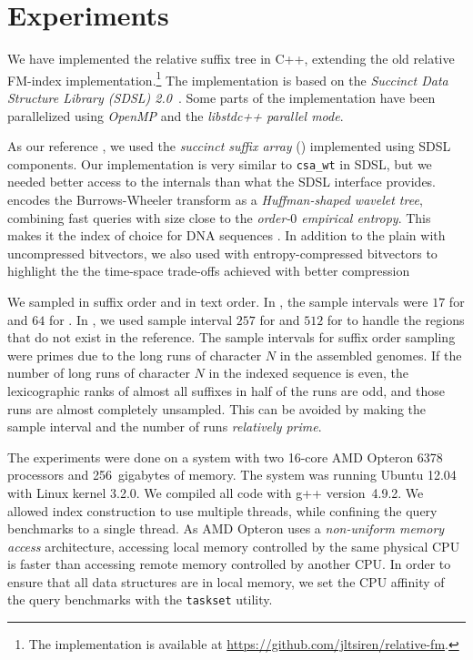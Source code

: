 \section{Experiments}

We have implemented the relative suffix tree in C++, extending the
old relative FM-index implementation.\footnote{The implementation is available
at \url{https://github.com/jltsiren/relative-fm}.} The implementation is based
on the \emph{Succinct Data Structure Library (SDSL) 2.0}~\cite{Gog2014b}. Some
parts of the implementation have been parallelized using \emph{OpenMP} and the
\emph{libstdc++ parallel mode}.

As our reference \CSA{}, we used the \emph{succinct suffix array} (\SSA{})
\cite{Ferragina2007a,Maekinen2005} implemented using SDSL components. Our
implementation is very similar to \texttt{csa\_wt} in SDSL, but we needed
better access to the internals than what the SDSL interface
provides. \SSA{} encodes the Burrows-Wheeler transform as a \emph{Huffman-shaped
wavelet tree}, combining fast queries with size close to the
\emph{order\nobreakdash-$0$ empirical entropy}. This makes it the
index of choice for DNA sequences \cite{Ferragina2009a}. In addition to
the plain \SSA{} with uncompressed bitvectors, we also used \SSArrr{} with
entropy-compressed bitvectors \cite{Raman2007} to highlight the
the time-space trade-offs achieved with better compression

We sampled \SA{} in suffix order and \ISA{} in text order. In \SSA, the sample
intervals were $17$ for \SA{} and $64$ for \ISA. In \RFM, we used sample
interval $257$ for \SA{} and $512$ for \ISA{} to handle the regions that do
not exist in the reference. The sample intervals for suffix order sampling
were primes due to the long runs of character $N$ in the assembled genomes. If
the number of long runs of character $N$ in the indexed sequence is even, the
lexicographic ranks of almost all suffixes in half of the runs are odd, and
those runs are almost completely unsampled. This can be avoided by making the
sample interval and the number of runs \emph{relatively prime}.

The experiments were done on a system with two 16\nobreakdash-core AMD Opteron 6378 processors and 256~gigabytes of memory. The system was running Ubuntu 12.04 with Linux kernel 3.2.0. We compiled all code with g++ version~4.9.2. We allowed index construction to use multiple threads, while confining the query benchmarks to a single thread. As AMD Opteron uses a \emph{non-uniform memory access} architecture, accessing local memory controlled by the same physical CPU is faster than accessing remote memory controlled by another CPU. In order to ensure that all data structures are in local memory, we set the CPU affinity of the query benchmarks with the \texttt{taskset} utility.

